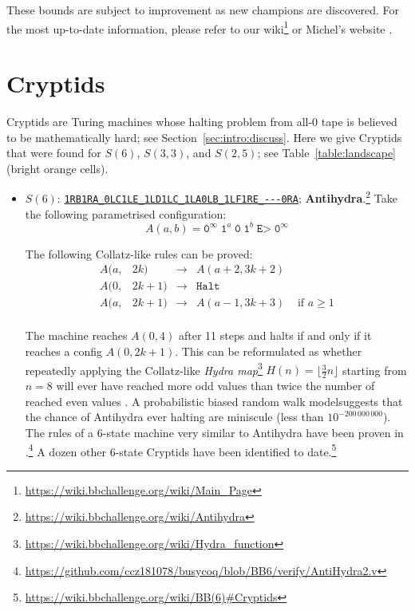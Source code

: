 \documentclass[a4paper,british]{article}
\theoremstyle{definition} %
\numberwithin{equation}{section}
\theoremstyle{definition} %
\newcommand{\tm}[1]{\href{https://bbchallenge.org/#1}{\texttt{\nolinkurl{#1}}}}
\newcommand{\szero}{\texttt{0}\xspace}
\newcommand{\sone}{\texttt{1}\xspace}
\begin{document}
These bounds are subject to improvement as new champions are discovered. For the most up-to-date information, please refer to our wiki\footnote{\url{https://wiki.bbchallenge.org/wiki/Main_Page}} or Michel’s website \cite{PMichel_website}.


\section{Cryptids}\label{app:cryptids}

Cryptids are Turing machines whose halting problem from all-0 tape is believed to be mathematically hard; see Section~\ref{sec:intro:discuss}. Here we give Cryptids that were found for $S(6)$, $S(3,3)$, and $S(2,5)$; see Table~\ref{table:landscape} (bright orange cells).

\begin{itemize}
    \item $S(6)$: \tm{1RB1RA_0LC1LE_1LD1LC_1LA0LB_1LF1RE_---0RA}; \textbf{Antihydra}.\footnote{\label{note:antihydra}\url{https://wiki.bbchallenge.org/wiki/Antihydra}} Take the following parametrised configuration:
          $$ A(a,b) = \szero^\infty \; \sone^a \; \szero \; \sone^b \; \texttt{E>} \; \szero^\infty$$

          The following Collatz-like rules can be proved:
          \[
              \begin{array}{llcll}
                  A(a, & 2k)   & \longrightarrow & A(a+2, 3k+2)                        \\
                  A(0, & 2k+1) & \longrightarrow & \texttt{Halt}                       \\
                  A(a, & 2k+1) & \longrightarrow & A(a-1, 3k+3) & \text{ if } a \geq 1 \\
              \end{array}
          \]

          The machine reaches $A(0,4)$ after 11 steps and halts if and only if it reaches a config $A(0,2k+1)$. This can be reformulated as whether repeatedly applying the Collatz-like \textit{Hydra map}\footnote{\url{https://wiki.bbchallenge.org/wiki/Hydra_function}} $H(n) = \lfloor \frac{3}{2}n\rfloor$ starting from $n=8$ will ever have reached more odd values than twice the number of reached even values \cite{ligocki2024bb6antis}. A probabilistic biased random walk model suggests that the chance of Antihydra ever halting are miniscule (less than $10^{-200\,000\,000}$). The rules of a 6-state machine very similar to Antihydra have been proven in \Coq.\footnote{\url{https://github.com/ccz181078/busycoq/blob/BB6/verify/AntiHydra2.v}} A dozen other 6-state Cryptids have been identified to date.\footnote{\url{https://wiki.bbchallenge.org/wiki/BB(6)\#Cryptids}}



\end{itemize}
\end{document}
